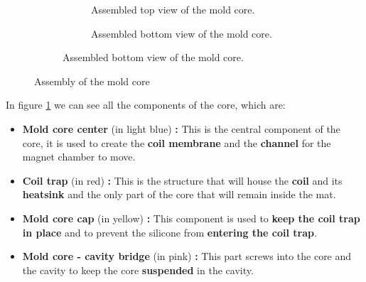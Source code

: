 \begin{itemize}
\begin{figure}
\begin{subfigure}[b]{0.6\textwidth}
\begin{subfigure}[b]{0.475\textwidth}
{                }
                \caption{Assembled top view of the mold core.}
            \end{subfigure}
            \hfill
            \begin{subfigure}[b]{0.475\textwidth}
                \centering
                \caption{Assembled bottom view of the mold core.}
            \end{subfigure}
        \end{subfigure}
        \caption{Assembly of the mold core}
        \label{fig: mat_mold_core}
    \end{figure}

    In figure \ref{fig: mat_mold_core} we can see all the components of the core, which are:
    \begin{itemize}
        \item \textbf{Mold core center } (in light blue) \textbf{: } This is the central component of the core, it is used to create the \textbf{coil membrane} and the \textbf{channel} for the magnet chamber to move.
        \item \textbf{Coil trap} (in red) \textbf{: } This is the structure that will house the \textbf{coil} and its \textbf{heatsink} and the only part of the core that will remain inside the mat.
        \item \textbf{Mold core cap } (in yellow) \textbf{: } This component is used to \textbf{keep the coil trap in place} and to prevent the silicone from \textbf{entering the coil trap}.
        \item \textbf{Mold core - cavity bridge } (in pink) \textbf{: } This part screws into the core and the cavity to keep the core \textbf{suspended} in the cavity.
    \end {itemize}
    

\end{itemize}
